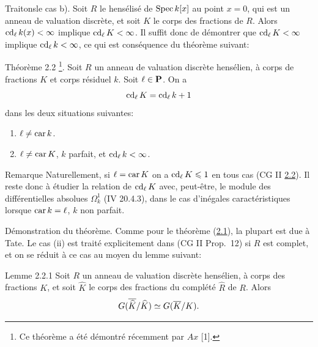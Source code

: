 \documentclass[10pt]{../fichiers-configuration-latex/smfart}
\begin{document}
Traitons\pageoriginale le cas b). Soit $R$ le hensélisé de $\operatorname{Spec}
k[x]$ au point $x=0$, qui est un anneau de valuation discrète, et soit
$K$ le corps des fractions de $R$. Alors $\operatorname{cd}_{\ell}k(x)<\infty$
implique $\operatorname{cd}_{\ell}K<\infty$. Il suffit donc de démontrer que
$\operatorname{cd}_{\ell}K<\infty$ implique $\operatorname{cd}_{\ell}k<\infty$, ce qui est
conséquence du théorème suivant:

\begin{enonce*}{Théorème 2.2}
\footnote{Ce théorème a été démontré récemment par $Ax$
    [1].}. Soit $R$ un anneau de valuation discrète hensélien, à
    corps de fractions $K$ et corps résiduel $k$. Soit $\ell\in
    \mathbf{P}$. On a
$$
\operatorname{cd}_{\ell}K=\operatorname{cd}_{\ell}k+1
$$
dans les deux situations suivantes:
\begin{enumerate}
\renewcommand{\theenumi}{\roman{enumi}}
\renewcommand{\labelenumi}{(\theenumi)}
\item $\ell\neq \operatorname{car} k$.

\item $\ell \neq \operatorname{car} K$, $k$ parfait, et $\operatorname{cd}_{\ell}k<\infty$.
\end{enumerate}
\end{enonce*}

\begin{enonce*}[remark]{Remarque}
Naturellement, si $\ell=\operatorname{car} K$ on a $\operatorname{cd}_{\ell}K\leqslant 1$ en tous cas
(CG II \hyperref[X.thm2.2]{2.2}). Il reste donc à étudier la relation de $\operatorname{cd}_{\ell}K$
avec, peut-être, le module des différentielles absolues $\Omega^1_k$
(\EGA IV 20.4.3), dans le cas d'inégales caractéristiques lorsque $\operatorname{car}
k=\ell$, $k$ non parfait. %
\end{enonce*}

Démonstration du théorème. Comme pour le théorème (\hyperref[X.thm2.1]{2.1}), la plupart
est due à Tate. Le cas (ii) est traité explicitement dans (CG II
Prop.~12) si $R$ est complet, et on se réduit à ce cas au moyen du
lemme suivant:

\begin{enonce*}{Lemme 2.2.1}
Soit $R$ un anneau de valuation discrète hensélien, à corps des
fractions $K$, et soit $\widehat{K}$ le corps des fractions du
complété $\widehat{R}$ de $R$. Alors
$$
G(\overline{\widehat{K}}/\widehat{K})\simeq G(\overline{K}/K){}.
$$
\end{enonce*}
\end{document}
